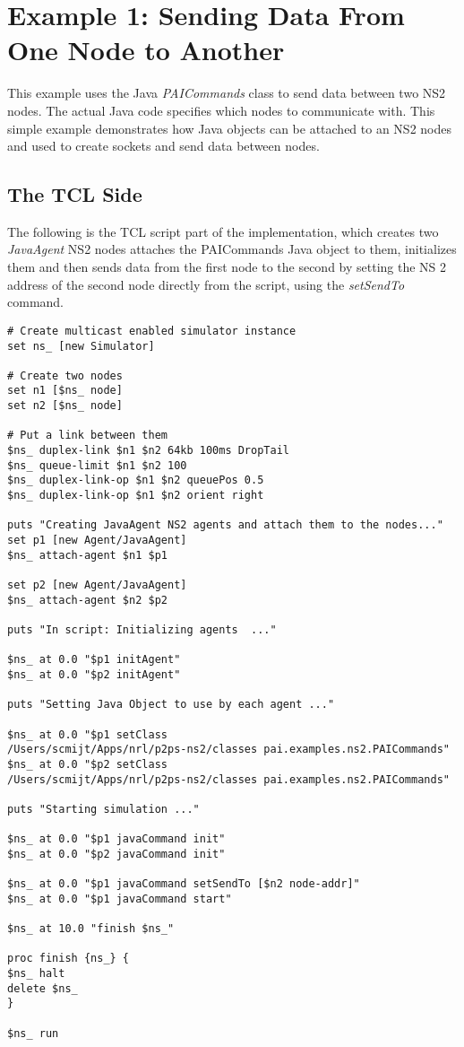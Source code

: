 \section{Example 1: Sending Data From One Node to Another}
\label{jni:node2node}

This example uses the Java \emph{PAICommands} class to 
send data between two NS2 nodes.  The actual Java
code specifies which nodes to communicate with.
This simple example demonstrates how Java objects
can be attached to an NS2 nodes and used to 
create sockets and send data between nodes.

\subsection{The TCL Side}
\label{jni:tclside}

The following is the TCL script part of the implementation, which creates two 
\emph{JavaAgent} NS2 nodes attaches the PAICommands Java object
to them, initializes them and then sends data from the first node to
the second by setting the NS 2 address of the second node directly from
the script, using the \emph{setSendTo} command.

\footnotesize
\begin{verbatim}
# Create multicast enabled simulator instance
set ns_ [new Simulator]

# Create two nodes
set n1 [$ns_ node]
set n2 [$ns_ node]

# Put a link between them
$ns_ duplex-link $n1 $n2 64kb 100ms DropTail
$ns_ queue-limit $n1 $n2 100
$ns_ duplex-link-op $n1 $n2 queuePos 0.5
$ns_ duplex-link-op $n1 $n2 orient right

puts "Creating JavaAgent NS2 agents and attach them to the nodes..."   
set p1 [new Agent/JavaAgent]
$ns_ attach-agent $n1 $p1

set p2 [new Agent/JavaAgent]
$ns_ attach-agent $n2 $p2

puts "In script: Initializing agents  ..." 
	
$ns_ at 0.0 "$p1 initAgent"
$ns_ at 0.0 "$p2 initAgent"

puts "Setting Java Object to use by each agent ..." 

$ns_ at 0.0 "$p1 setClass 
/Users/scmijt/Apps/nrl/p2ps-ns2/classes pai.examples.ns2.PAICommands"
$ns_ at 0.0 "$p2 setClass 
/Users/scmijt/Apps/nrl/p2ps-ns2/classes pai.examples.ns2.PAICommands"

puts "Starting simulation ..." 

$ns_ at 0.0 "$p1 javaCommand init"
$ns_ at 0.0 "$p2 javaCommand init"

$ns_ at 0.0 "$p1 javaCommand setSendTo [$n2 node-addr]"
$ns_ at 0.0 "$p1 javaCommand start"

$ns_ at 10.0 "finish $ns_"

proc finish {ns_} {
$ns_ halt
delete $ns_
}

$ns_ run

\end{verbatim}
\normalsize

